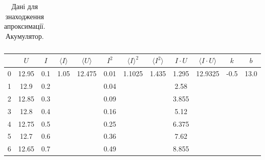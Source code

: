 \documentclass[a4paper,12pt]{article}
\begin{document}
\begin{justify}
\begin{table}[htp]
\begin{adjustwidth}{-0.5cm}{}
\begin{tabular}{|c|c|c|c|c|c|c|c|c|c|c|c|}
\end{tabular}
\end{adjustwidth}
\caption{Дані для знаходження апроксимації. Акумулятор.}
\label{table:approxa}
\end{table}
\begin{table}[htp]\centering
\begin{tabular}{|c|c|c|c|c|c|c|c|c|c|c|c|}
\hline
   & $U$   & $I$ & $\langle I\rangle$     & $\langle U\rangle$       & $I^2$ & $\langle I\rangle^2$     & $\langle I^2\rangle$    & $I\cdot U$ & $\langle I\cdot U\rangle$ & $k$                    & $b$                    \\ \hline
0  & 12.95 & 0.1 & \multirow{20}{*}{1.05} & \multirow{20}{*}{12.475} & 0.01  & \multirow{20}{*}{1.1025} & \multirow{20}{*}{1.435} & 1.295      & \multirow{20}{*}{12.9325} & \multirow{20}{*}{-0.5} & \multirow{20}{*}{13.0} \\ \cline{1-3} \cline{6-6} \cline{9-9}
1  & 12.9  & 0.2 &                        &                          & 0.04  &                          &                         & 2.58       &                           &                        &                        \\ \cline{1-3} \cline{6-6} \cline{9-9}
2  & 12.85 & 0.3 &                        &                          & 0.09  &                          &                         & 3.855      &                           &                        &                        \\ \cline{1-3} \cline{6-6} \cline{9-9}
3  & 12.8  & 0.4 &                        &                          & 0.16  &                          &                         & 5.12       &                           &                        &                        \\ \cline{1-3} \cline{6-6} \cline{9-9}
4  & 12.75 & 0.5 &                        &                          & 0.25  &                          &                         & 6.375      &                           &                        &                        \\ \cline{1-3} \cline{6-6} \cline{9-9}
5  & 12.7  & 0.6 &                        &                          & 0.36  &                          &                         & 7.62       &                           &                        &                        \\ \cline{1-3} \cline{6-6} \cline{9-9}
6  & 12.65 & 0.7 &                        &                          & 0.49  &                          &                         & 8.855      &                           &                        &                        \\ \cline{1-3} \cline{6-6} \cline{9-9}

\end{tabular}
\end{table}
\end{justify}
\end{document}
